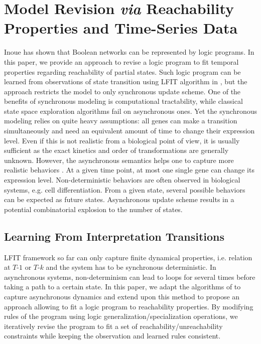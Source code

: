 \section{Model Revision \textit{via} Reachability Properties and Time-Series Data}
Inoue \cite{inoue2011logic} has shown that Boolean networks can be represented by logic programs.
In this paper, we provide an approach to revise a logic program to fit temporal properties regarding reachability of partial states.
%
Such logic program can be learned from observations of state transition using LFIT algorithm in \cite{ribeiro2015learning}, but the approach restricts the model to only synchronous update scheme.
One of the benefits of synchronous modeling is computational tractability, while classical state space exploration algorithms fail on asynchronous ones.
Yet the synchronous modeling relies on quite heavy assumptions:
all genes can make a transition simultaneously and need an equivalent amount of time to change their expression level.
Even if this is not realistic from a biological point of view, it is usually sufficient as the exact kinetics and order of transformations are generally unknown.
However, the asynchronous semantics helps one to capture more realistic behaviors \cite{bernot2009}.
At a given time point, at most one single gene can change its expression level.
Non-deterministic behaviors are often observed in biological systems, e.g. cell differentiation.
From a given state, several possible behaviors can be expected as future states.
Asynchronous update scheme results in a potential combinatorial explosion to the number of states.


\subsection{Learning From Interpretation Transitions}\label{sec:lfit}
LFIT framework so far can only capture finite dynamical properties, i.e. relation at $T$-$1$ or $T$-$k$ and the system has to be synchronous deterministic.
In asynchronous systems, non-determinism can lead to loops for several times before taking a path to a certain state.
In this paper, we adapt the algorithms of \cite{ribeiro2015learning,DMTRICLP15} to capture asynchronous dynamics and extend upon this method to propose an approach allowing to fit a logic program to reachability properties.
By modifying rules of the program using logic generalization/specialization operations, we iteratively revise the program to fit a set of reachability/unreachability constraints while keeping the observation and learned rules consistent.

